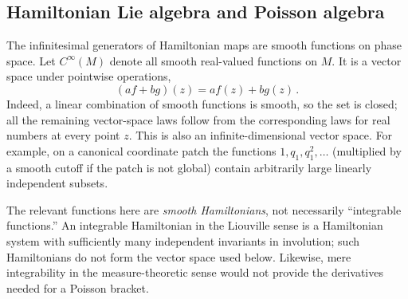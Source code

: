 \subsection{Hamiltonian Lie algebra and Poisson algebra}
\label{sec:hamiltonian-lie-algebra}
The infinitesimal generators of Hamiltonian maps are smooth functions on
phase space.  Let $C^\infty(M)$ denote all smooth real-valued functions on
$M$.  It is a vector space under pointwise operations,
\begin{equation}
    (af + bg)(z) = af(z) + bg(z)\,.
\end{equation}
Indeed, a linear combination of smooth functions is smooth, so the set is
closed; all the remaining vector-space laws follow from the corresponding
laws for real numbers at every point $z$.  This is also an
infinite-dimensional vector space.  For example, on a canonical coordinate
patch the functions $1,q_1,q_1^2,\ldots$ (multiplied by a smooth cutoff if
the patch is not global) contain arbitrarily large linearly independent
subsets.

The relevant functions here are \emph{smooth Hamiltonians}, not necessarily
``integrable functions.''  An integrable Hamiltonian in the Liouville sense
is a Hamiltonian system with sufficiently many independent invariants in
involution; such Hamiltonians do not form the vector space used below.
Likewise, mere integrability in the measure-theoretic sense would not provide
the derivatives needed for a Poisson bracket.

